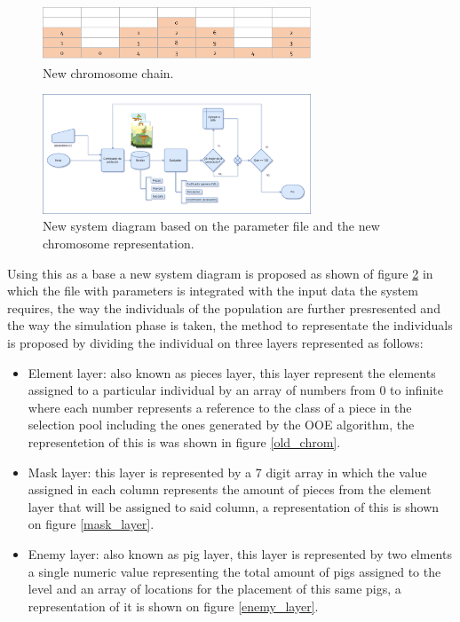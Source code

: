 \documentclass[conference]{IEEEtran}
\begin{document}
\begin{figure}[htbp]
\centerline{\includegraphics[width=80mm]{Images/chromosome_chain_new_model.png}}
\caption{New chromosome chain.}
\label{new_chrom}
\end{figure}

\begin{figure}[htbp]
\centerline{\includegraphics[width=80mm]{Images/new_model.png}}
\caption{New system diagram based on the parameter file and the new chromosome representation.}
\label{new_model}
\end{figure}

Using this as a base a new system diagram is proposed as shown of figure
\ref{new_model} in which the file with parameters is integrated with the input
data  the system requires, the way the individuals of the population are further
presresented and the way the simulation phase is taken, the method to
representate the individuals is proposed by dividing the individual on three
layers represented as follows:

\begin{itemize}
    \item Element layer: also known as pieces layer, this layer represent the
    elements assigned to a particular individual by an array of numbers from 0
    to infinite where each number represents a reference to the class of a piece
    in the selection pool including the ones generated by the OOE algorithm, the
    representetion of this is was shown in figure \ref{old_chrom}.
    \item  Mask layer: this layer is represented by a 7 digit array in which the
    value assigned in each column represents the amount of pieces from the
    element layer that will be assigned to said column, a representation of this
    is shown on figure \ref{mask_layer}.
    \item Enemy layer: also known as pig layer, this layer is represented by two
    elments a single numeric value representing the total amount of pigs
    assigned to the level and an array of locations for the placement of this
    same pigs, a representation of it is shown on figure \ref{enemy_layer}. 
\end{itemize}
\end{document}

